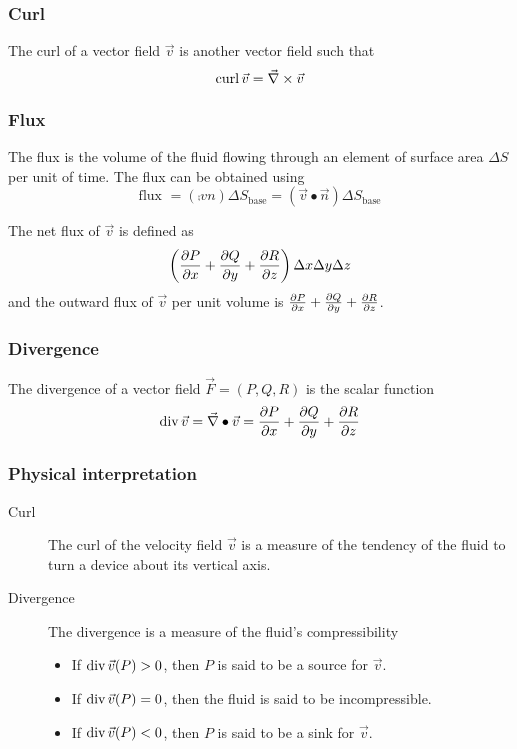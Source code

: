\documentclass[10pt, twocolumn]{article}
\theoremstyle{remark}
\begin{document}
\subsubsection*{Curl}
The curl of a vector field \(\vec{v}\) is another vector field such that
\[
  \mathrm{curl}\,\vec{v}= \vec{\nabla} \times \vec{v}
\]

\subsubsection*{Flux}
The flux is the volume of the fluid flowing through an element of surface area \(\Delta S\) per unit of time.
The flux can be obtained using
\[
  \text{flux } = \left( \comp{v}{n} \right){\Delta S}_{\mathrm{base}} = \left( \vec{v} \bullet \vec{n} \right){\Delta S}_{\mathrm{base}}
\]

The net flux of \(\vec{v}\) is defined as
\[
  \left( \frac{\partial P}{\partial x} + \frac{\partial Q}{\partial y} + \frac{\partial R}{\partial z} \right)\Delta x \Delta y \Delta z
\]
and the outward flux of \(\vec{v}\) per unit volume is \(\frac{\partial P}{\partial x} + \frac{\partial Q}{\partial y} + \frac{\partial R}{\partial z}\).

\subsubsection*{Divergence}
The divergence of a vector field \(\vec{F} = (P, Q, R)\) is the scalar function
\[
  \mathrm{div}\,\vec{v} = \vec{\nabla} \bullet \vec{v} = \frac{\partial P}{\partial x} + \frac{\partial Q}{\partial y} + \frac{\partial R}{\partial z}
\]

\subsubsection*{Physical interpretation}
\begin{description}
  \item[Curl] The curl of the velocity field \(\vec{v}\) is a measure of the tendency of the fluid to turn a device about its vertical axis.
  \item[Divergence] The divergence is a measure of the fluid's compressibility
        \begin{itemize}
          \vspace{6pt}
          \item If \(\mathrm{div}\,\vec{v}(P) > 0\), then \(P\) is said to be a source for \(\vec{v}\).
          \item If \(\mathrm{div}\,\vec{v}(P) = 0\), then the fluid is said to be incompressible.
          \item If \(\mathrm{div}\,\vec{v}(P) < 0\), then \(P\) is said to be a sink for \(\vec{v}\).
        \end{itemize}
\end{description}
\end{document}
